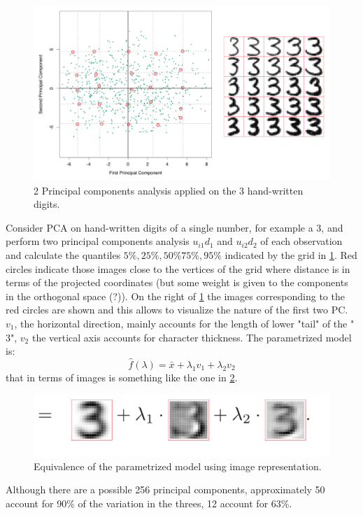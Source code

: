 \documentclass[12pt, letterpaper]{article}
\theoremstyle{definition}
\begin{document}
\begin{figure}
\centering
\includegraphics[scale=0.5]{img/2PC}
\caption{2 Principal components analysis applied on the $3$ hand-written digits.}
\label{2PC}
\end{figure}
Consider PCA on hand-written digits of a single number, for example a $3$, and perform two principal components analysis $u_{i1}d_1$ and $u_{i2}d_2$ of each observation and calculate the quantiles $5\%, 25\%, 50\% 75\%, 95\%$ indicated by the grid in \ref{2PC}. Red circles indicate those images close to the vertices of the grid where distance is in terms of the projected coordinates (but some weight is given to the components in the orthogonal space (?)). On the right of \ref{2PC} the images corresponding to the red circles are shown and this allows to visualize the nature of the first two PC. $v_1$, the horizontal direction, mainly accounts for the length of lower "tail" of the "$3$", $v_2$ the vertical axis  accounts for character thickness. The parametrized model is:
\begin{equation}
\hat{f}(\lambda) = \bar{x} + \lambda_1 v_1+\lambda_2 v_2 
\end{equation}
that in terms of images is something like the one in \ref{modelImage}.


\begin{figure}
\centering
\includegraphics[scale=0.7]{img/modelImage}
\caption{Equivalence of the parametrized model using image representation.}
\label{modelImage}
\end{figure}
Although there are a possible 256 principal components, approximately 50 account for 90\% of the variation in the threes, 12 account for 63\%.
\end{document}
